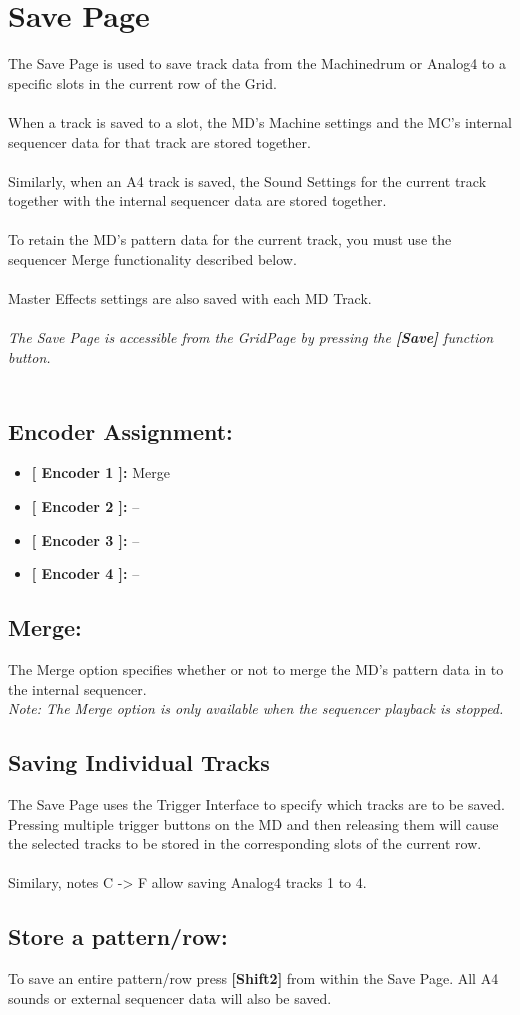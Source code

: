 \chapter{Save Page}

The Save Page is used to save track data from the Machinedrum or Analog4 to a specific slots in the current row of the Grid.\\
\\
When a track is saved to a slot, the MD's Machine settings and the MC's internal sequencer data for that track are stored together.\\
\\
Similarly, when an A4 track is saved, the Sound Settings for the current track together with the internal sequencer data are stored together.\\
\\
To retain the MD's pattern data for the current track, you must use the sequencer Merge functionality described below.\\
\\
Master Effects settings are also saved with each MD Track.
\\\\
\textit{The Save Page is accessible from the GridPage by pressing the  \textbf{[Save]} function button.}
\\\\
\section{Encoder Assignment:}
\begin{itemize}
	\item \textbf{[ Encoder 1 ]: }Merge
	\item \textbf{[ Encoder 2 ]: }--
	\item \textbf{[ Encoder 3 ]: }--
	\item \textbf{[ Encoder 4 ]: }--
\end{itemize}
\section{Merge:}
The Merge option specifies whether or not to merge the MD's pattern data in to the internal sequencer. 
\\
\textit{Note: The Merge option is only available when the sequencer playback is stopped.}
\section{Saving Individual Tracks}
The Save Page uses the Trigger Interface to specify which tracks are to be saved. Pressing multiple trigger buttons on the MD and then releasing them will cause the selected tracks to be stored in the corresponding slots of the current row.\\ \\
Similary, notes C -> F allow saving Analog4 tracks 1 to 4.
\section{Store a pattern/row:}
To save an entire pattern/row press \textbf{[Shift2]} from within the Save Page. All A4 sounds or external sequencer data will also be saved.\\

\\


